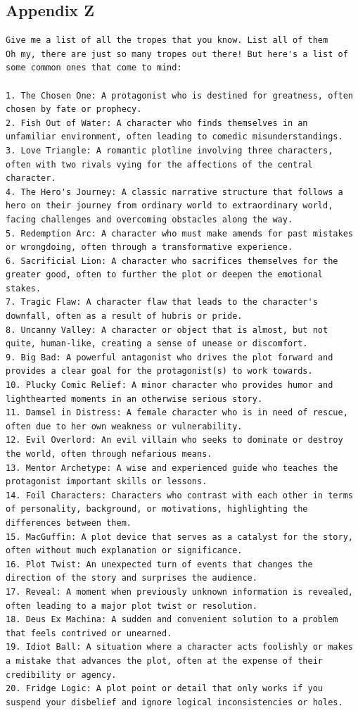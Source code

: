 \documentclass[11pt]{article}
\begin{document}
\subsection{Appendix Z}
\begin{lstlisting}
Give me a list of all the tropes that you know. List all of them
Oh my, there are just so many tropes out there! But here's a list of some common ones that come to mind:

1. The Chosen One: A protagonist who is destined for greatness, often chosen by fate or prophecy.
2. Fish Out of Water: A character who finds themselves in an unfamiliar environment, often leading to comedic misunderstandings.
3. Love Triangle: A romantic plotline involving three characters, often with two rivals vying for the affections of the central character.
4. The Hero's Journey: A classic narrative structure that follows a hero on their journey from ordinary world to extraordinary world, facing challenges and overcoming obstacles along the way.
5. Redemption Arc: A character who must make amends for past mistakes or wrongdoing, often through a transformative experience.
6. Sacrificial Lion: A character who sacrifices themselves for the greater good, often to further the plot or deepen the emotional stakes.
7. Tragic Flaw: A character flaw that leads to the character's downfall, often as a result of hubris or pride.
8. Uncanny Valley: A character or object that is almost, but not quite, human-like, creating a sense of unease or discomfort.
9. Big Bad: A powerful antagonist who drives the plot forward and provides a clear goal for the protagonist(s) to work towards.
10. Plucky Comic Relief: A minor character who provides humor and lighthearted moments in an otherwise serious story.
11. Damsel in Distress: A female character who is in need of rescue, often due to her own weakness or vulnerability.
12. Evil Overlord: An evil villain who seeks to dominate or destroy the world, often through nefarious means.
13. Mentor Archetype: A wise and experienced guide who teaches the protagonist important skills or lessons.
14. Foil Characters: Characters who contrast with each other in terms of personality, background, or motivations, highlighting the differences between them.
15. MacGuffin: A plot device that serves as a catalyst for the story, often without much explanation or significance.
16. Plot Twist: An unexpected turn of events that changes the direction of the story and surprises the audience.
17. Reveal: A moment when previously unknown information is revealed, often leading to a major plot twist or resolution.
18. Deus Ex Machina: A sudden and convenient solution to a problem that feels contrived or unearned.
19. Idiot Ball: A situation where a character acts foolishly or makes a mistake that advances the plot, often at the expense of their credibility or agency.
20. Fridge Logic: A plot point or detail that only works if you suspend your disbelief and ignore logical inconsistencies or holes.


\end{lstlisting}
\end{document}
